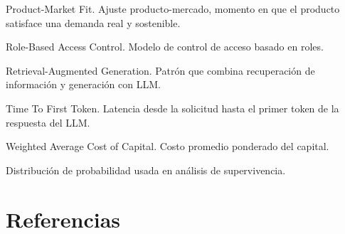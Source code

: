 \documentclass[10pt,a4paper,oneside]{report}
\begin{document}
\begin{description}[leftmargin=1.4em,itemsep=2pt]
\item[PMF] Product-Market Fit. Ajuste producto-mercado, momento en que el producto satisface una demanda real y sostenible.
\item[RBAC] Role-Based Access Control. Modelo de control de acceso basado en roles.
\item[RAG] Retrieval-Augmented Generation. Patrón que combina recuperación de información y generación con LLM.
\item[TTFT] Time To First Token. Latencia desde la solicitud hasta el primer token de la respuesta del LLM.
\item[WACC] Weighted Average Cost of Capital. Costo promedio ponderado del capital.
\item[Weibull] Distribución de probabilidad usada en análisis de supervivencia.
\end{description}

\chapter{Referencias}
\end{document}
